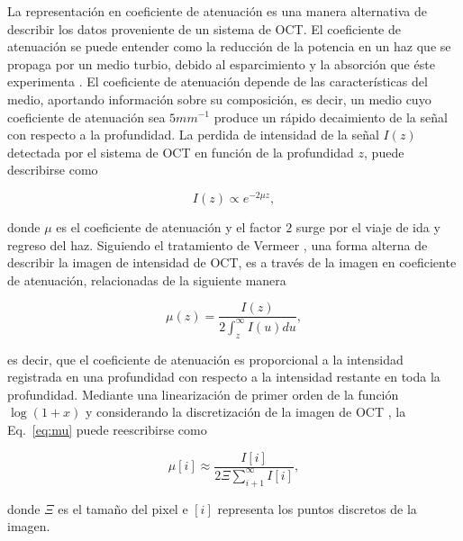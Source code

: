 La representación en coeficiente de atenuación es una manera alternativa de describir los datos proveniente de un sistema de OCT. El coeficiente de atenuación se puede entender como la reducción de la potencia en un haz que se propaga por un medio turbio, debido al esparcimiento y la absorción que éste experimenta \cite{Vermeer2013}. El coeficiente de atenuación depende de las características del medio, aportando información sobre su composición, es decir, un medio cuyo coeficiente de atenuación sea $5mm^{-1}$ produce un rápido decaimiento de la señal con respecto a la profundidad. La perdida de intensidad de la señal $I(z)$ detectada por el sistema de OCT en función de la profundidad $z$, puede describirse como


\begin{equation}
 I(z) \propto e^{-2\mu z},
\end{equation}

\noindent donde $\mu$ es el coeficiente de atenuación y el factor $2$ surge por el viaje de ida y regreso del haz. Siguiendo el tratamiento de Vermeer \etal \cite{Vermeer2013}, una forma alterna de describir la imagen de intensidad de OCT, es a través de la imagen en coeficiente de atenuación, relacionadas de la siguiente manera

\begin{equation}
\label{eq:mu}
\mu (z) = \frac{I(z)}{2\int_{z}^{\infty} I(u)du},
\end{equation}

\noindent es decir, que el coeficiente de atenuación es proporcional a la intensidad registrada en una profundidad con respecto a la intensidad restante en toda la profundidad. Mediante una linearización de primer orden de la función $\log(1+x)$ y considerando la discretización de la imagen de OCT \cite{Vermeer2013}, la Eq.~\ref{eq:mu} puede reescribirse como 

\begin{equation}
\label{eq:mu_i}
\mu [i] \approx \frac{I[i]}{2\Xi \sum_{i+1}^{\infty}I[i]},
\end{equation}

\noindent donde $\Xi$ es el tamaño del pixel e $[i]$ representa los puntos discretos de la imagen. 


